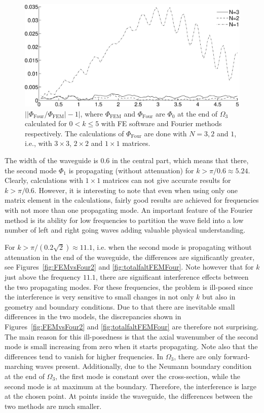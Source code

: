 \documentclass[numreferences]{kluwer}
\providecommand{\abs}[1]{\left\lvert#1\right\rvert}
\renewcommand{\Phi}{\varPhi}
\renewcommand{\Phi}{\varPhi}
\begin{document}
\begin{figure}[htb]
  \centering
  \includegraphics[width=0.9\linewidth]{relerr123}
  \caption{$\abs{\abs{\Phi_{\text{Four}}/\Phi_{\text{FEM}}}-1}$, where
    $\Phi_{\text{FEM}}$ and $\Phi_{\text{Four}}$ are $\Phi_0$ at the
    end of $\Omega_3$ calculated for $0<k\le5$ with FE software and
    Fourier methods respectively. The calculations of
    $\Phi_{\text{Four}}$ are done with $N=3,2$ and $1$, i.e., with
    $3\times3$, $2\times2$ and $1\times1$ matrices.}
  \label{fig:relerr123}
\end{figure}

The width of the waveguide is $0.6$ in the central part, which means
that there, the second mode $\Phi_1$ is propagating (without
attenuation) for $k>\pi/0.6\approx5.24$. Clearly, calculations with
$1\times1$ matrices can not give accurate results for $k>\pi/0.6$.
However, it is interesting to note that even when using only one
matrix element in the calculations, fairly good results are achieved
for frequencies with not more than one propagating mode. An important
feature of the Fourier method is its ability for low frequencies to
partition the wave field into a low number of left and right going
waves adding valuable physical understanding.

For $k>\pi/(0.2\sqrt2)\approx11.1$, i.e. when the second mode is
propagating without attenuation in the end of the waveguide, the
differences are significantly greater, see
Figures~\ref{fig:FEMvsFour2} and \ref{fig:totalfaltFEMFour}. Note
however that for $k$ just above the frequency $11.1$, there are
significant interference effects between the two propagating
modes. For these frequencies, the problem is ill-posed since the
interference is very sensitive to small changes in not only $k$ but
also in geometry and boundary conditions. Due to that there are
inevitable small differences in the two models, the discrepancies
shown in Figures~\ref{fig:FEMvsFour2} and \ref{fig:totalfaltFEMFour}
are therefore not surprising. The main reason for this ill-posedness
is that the axial wavenumber of the second mode is small increasing
from zero when it starts propagating. Note also that the differences
tend to vanish for higher frequencies.  In $\Omega_3$, there are only
forward-marching waves present. Additionally, due to the Neumann
boundary condition at the end of $\Omega_3$, the first mode is
constant over the cross-section, while the second mode is at maximum
at the boundary. Therefore, the interference is large at the chosen
point. At points inside the waveguide, the differences between the two
methods are much smaller.
\end{document}
